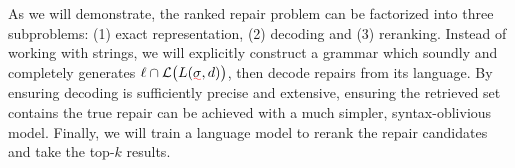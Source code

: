 \documentclass[sigplan,review,acmsmall,nonacm,screen,anonymous]{acmart}\settopmatter{printfolios=false,printccs=false,printacmref=false}
\begin{document}
As we will demonstrate, the ranked repair problem can be factorized into three subproblems: (1) exact representation, (2) decoding and (3) reranking. Instead of working with strings, we will explicitly construct a grammar which soundly and completely generates $\ell \cap \mathcal{L}\big(L(\err\sigma, d)\big)$, then decode repairs from its language. By ensuring decoding is sufficiently precise and extensive, ensuring the retrieved set contains the true repair can be achieved with a much simpler, syntax-oblivious model. Finally, we will train a language model to rerank the repair candidates and take the top-$k$ results.

%
%
%
%
\end{document}
